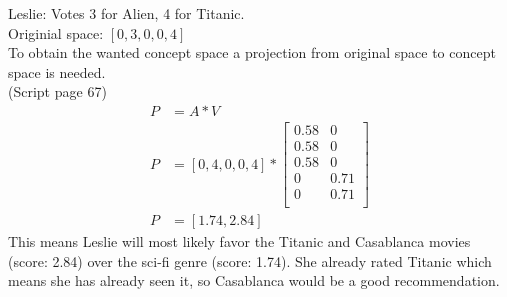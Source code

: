 

\newcommand{\ExerciseNumber}{11}

\newcommand{\PersonOne}{Marcel Bruckner (03674122)}
\newcommand{\PersonTwo}{Julian Hohenadel (03673879)}
\newcommand{\PersonThree}{Kevin Bein (03707775)}






%
%
%
\begin{flushleft}
Leslie: Votes 3 for Alien, 4 for Titanic.\\
Originial space: $[0, 3, 0, 0, 4]$\\
To obtain the wanted concept space a projection from original space to concept space is needed.\\
(Script page 67)
\begin{align*}
P &= A * V \\
P &= [0, 4, 0, 0, 4] *
\begin{bmatrix}
0.58 & 0 \\
0.58 & 0 \\
0.58 & 0 \\
0 & 0.71 \\
0 & 0.71 \\
\end{bmatrix}
\\
P &= [1.74, 2.84]
\end{align*}
This means Leslie will most likely favor the Titanic and Casablanca movies (score: 2.84) over the sci-fi genre (score: 1.74). She already rated Titanic which means she has already seen it, so Casablanca would be a good recommendation.\\
\end{flushleft}
%
%




